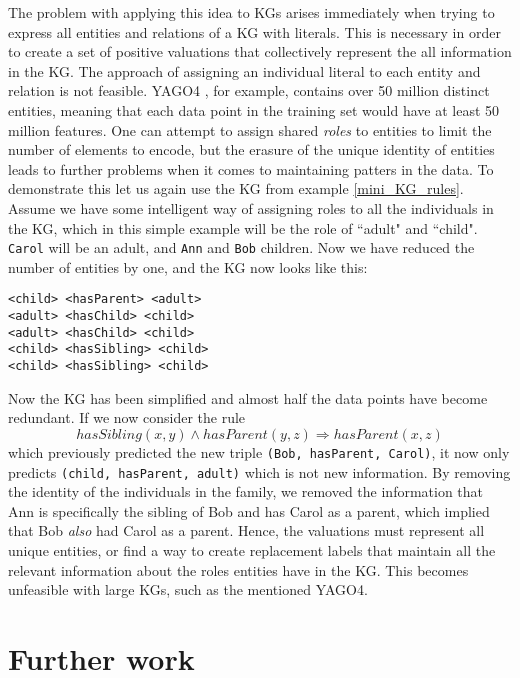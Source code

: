The problem with applying this idea to KGs arises immediately when trying to express all entities and relations of a KG with literals. This is necessary in order to create a set of positive valuations that collectively represent the all information in the KG. The approach of assigning an individual literal to each entity and relation is not feasible. YAGO4 \cite{yago4}, for example, contains over 50 million distinct entities, meaning that each data point in the training set would have at least 50 million features. One can attempt to assign shared \textit{roles} to entities to limit the number of elements to encode, but the erasure of the unique identity of entities leads to further problems when it comes to maintaining patters in the data. To demonstrate this let us again use the KG from example \ref{mini_KG_rules}. Assume we have some intelligent way of assigning roles to all the individuals in the KG, which in this simple example will be the role of ``adult" and ``child". \texttt{Carol} will be an adult, and \texttt{Ann} and \texttt{Bob} children. Now we have reduced the number of entities by one, and the KG now looks like this:

\begin{example}
\begin{lstlisting}[]
<child> <hasParent> <adult>
<adult> <hasChild> <child>
<adult> <hasChild> <child>
<child> <hasSibling> <child>
<child> <hasSibling> <child>
\end{lstlisting}
\label{mini_simple_KG_rules}
\end{example}

Now the KG has been simplified and almost half the data points have become redundant. If we now consider the rule \[hasSibling(x, y) \wedge hasParent(y,z) \Rightarrow hasParent(x,z)\] which previously predicted the new triple \texttt{(Bob, hasParent, Carol)}, it now only predicts \texttt{(child, hasParent, adult)} which is not new information. By removing the identity of the individuals in the family, we removed the information that Ann is specifically the sibling of Bob and has Carol as a parent, which implied that Bob \textit{also} had Carol as a parent. Hence, the valuations must represent all unique entities, or find a way to create replacement labels that maintain all the relevant information about the roles entities have in the KG. This becomes unfeasible with large KGs, such as the mentioned YAGO4.

\section{Further work}


